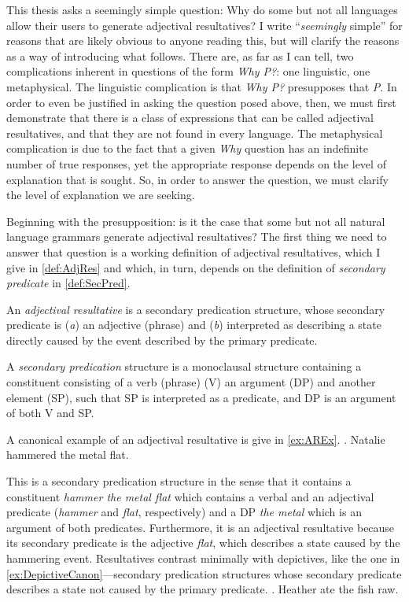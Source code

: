 \documentclass[MilwayThesis]{subfiles}
\begin{document}
This thesis asks a seemingly simple question: Why do some but not all languages allow their users to generate adjectival resultatives?
I write ``\textit{seemingly} simple'' for reasons that are likely obvious to anyone reading this, but will clarify the reasons as a way of introducing what follows.
There are, as far as I can tell, two complications inherent in questions of the form \textit{Why P?}: one linguistic, one metaphysical.
The linguistic complication is that \textit{Why P?} presupposes that \textit{P}.
In order to even be justified in asking the question posed above, then, we must first demonstrate that there is a class of expressions that can be called adjectival resultatives, and that they are not found in every language.
The metaphysical complication is due to the fact that a given \textit{Why} question has an indefinite number of true responses, yet the appropriate response depends on the level of explanation that is sought.
So, in order to answer the question, we must clarify the level of explanation we are seeking.

Beginning with the presupposition: is it the case that some but not all natural language grammars generate adjectival resultatives?
The first thing we need to answer that question is a working definition of adjectival resultatives, which I give in \cref{def:AdjRes} and which, in turn, depends on the definition of \textit{secondary predicate} in \cref{def:SecPred}.
\begin{defn}\label{def:AdjRes}
	An \textit{adjectival resultative} is a secondary predication structure, whose secondary predicate is (\textit{a}) an adjective (phrase) and (\textit{b}) interpreted as describing a state directly caused by the event described by the primary predicate.
\end{defn}
\begin{defn}\label{def:SecPred}
	A \textit{secondary predication} structure is a monoclausal structure containing a constituent consisting of a verb (phrase) (V) an argument (DP) and another element (SP), such that SP is interpreted as a predicate, and DP is an argument of both V and SP.
\end{defn}

A canonical example of an adjectival resultative is give in \cref{ex:AREx}.
\ex. \label{ex:AREx} Natalie hammered the metal flat.

This is a secondary predication structure in the sense that it contains a constituent \textit{hammer the metal flat} which contains a verbal and an adjectival predicate (\textit{hammer} and \textit{flat}, respectively) and a DP \textit{the metal} which is an argument of both predicates.
Furthermore, it is an adjectival resultative because its secondary predicate is the adjective \textit{flat}, which describes a state caused by the hammering event.
Resultatives contrast minimally with depictives, like the one in \cref{ex:DepictiveCanon}---secondary predication structures whose secondary predicate describes a state not caused by the primary predicate.
\ex.\label{ex:DepictiveCanon} Heather ate the fish raw.
\end{document}
